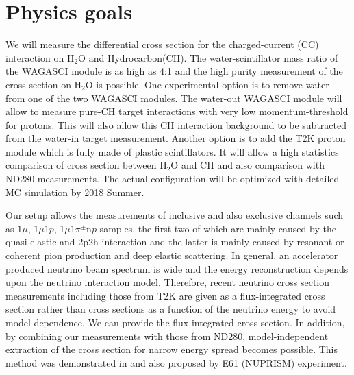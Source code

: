 \section{Physics goals}
We will measure the differential cross section for the charged-current (CC) interaction on $\mathrm{H_2O}$ and Hydrocarbon(CH).
The water-scintillator mass ratio of the WAGASCI module is as high as 4:1 and the high purity measurement
of the cross section on $\mathrm{H_2O}$ is possible.
One experimental option is to remove water from one of the two WAGASCI modules. 
The water-out WAGASCI module will allow to measure pure-CH target interactions with very low momentum-threshold for protons.
This will also allow this CH interaction background to be subtracted from the water-in target measurement.
Another option is to add the T2K proton module which is fully made of plastic scintillators.
It will allow a high statistics
comparison of cross section between $\mathrm{H_2O}$ and CH and also comparison
with ND280 measurements.
The actual configuration will be optimized with detailed MC simulation by 2018 Summer.


Our setup allows the measurements of inclusive and also exclusive channels such as
$1\mu$, $1\mu 1p$, 1$\mu 1\pi^\pm \mathrm{n}p$ samples, the first two of which are mainly caused by the quasi-elastic and
2p2h interaction and the latter is mainly caused by resonant or coherent pion production and deep elastic scattering.
In general, an accelerator produced neutrino beam spectrum is wide and the energy reconstruction
depends upon the neutrino interaction model.
Therefore, recent neutrino cross section measurements including those from T2K are given
as a flux-integrated cross section rather than cross sections as a function of the neutrino energy 
to avoid model dependence.
We can provide the flux-integrated cross section.
In addition, by combining our measurements with those from ND280, model-independent extraction of the cross section
for narrow energy spread becomes possible.
This method was demonstrated in \cite{Abe:2015biq} and also proposed by E61 (NUPRISM) experiment.


